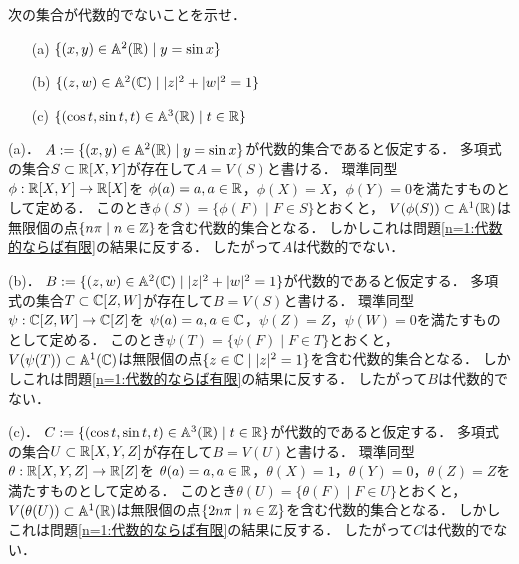 \begin{prob}
  次の集合が代数的でないことを示せ．
  \begin{itemize}
    \item[(a)] $\{(x,y) \in \mathbb{A}^2(\mathbb{R}) \mid y = \sin x\}$
    \item[(b)] $\{( z,w ) \in \mathbb{A}^2(\mathbb{C}) \mid |z|^2 + |w|^2 = 1 \}$
    \item[(c)] $\{ (\cos t, \sin t, t) \in \mathbb{A}^3(\mathbb{R}) \mid t \in \mathbb{R}\}$
  \end{itemize}
\end{prob}
\begin{ans}
  (a)．
  $A := \{(x,y) \in \mathbb{A}^2(\mathbb{R}) \mid y = \sin x\}$が代数的集合であると仮定する．
  多項式の集合$S \subset \mathbb{R}[X,Y]$が存在して$A = V(S)$と書ける．
  環準同型$\phi : \mathbb{R}[X,Y] \to \mathbb{R}[X]$を
  $\phi(a) = a, a \in \mathbb{R}$，$\phi(X) = X$，$\phi(Y) = 0$を満たすものとして定める．
  このとき$\phi(S) = \{\phi(F) \mid F \in S\}$とおくと，
  $V(\phi(S)) \subset \mathbb{A}^1(\mathbb{R})$は無限個の点$\{ n\pi \mid n \in \mathbb{Z} \}$を含む代数的集合となる．
  しかしこれは問題\ref{n=1:代数的ならば有限}の結果に反する．
  したがって$A$は代数的でない．
  
  (b)．
  $B := \{ (z,w) \in \mathbb{A}^2(\mathbb{C}) \mid |z|^2 + |w|^2 = 1 \}$が代数的であると仮定する．
  多項式の集合$T \subset \mathbb{C}[Z,W]$が存在して$B = V(S)$と書ける．
  環準同型$\psi : \mathbb{C}[Z,W] \to \mathbb{C}[Z]$を
  $\psi(a) = a, a \in \mathbb{C}$，$\psi(Z) = Z$，$\psi(W) = 0$を満たすものとして定める．
  このとき$\psi(T) = \{\psi(F) \mid F \in T\}$とおくと，
  $V(\psi(T)) \subset \mathbb{A}^1(\mathbb{C})$は無限個の点$\{ z \in \mathbb{C} \mid |z|^2 = 1 \}$を含む代数的集合となる．
  しかしこれは問題\ref{n=1:代数的ならば有限}の結果に反する．
  したがって$B$は代数的でない．

  (c)．
  $C := \{ (\cos t, \sin t, t) \in \mathbb{A}^3(\mathbb{R}) \mid t \in \mathbb{R}\}$が代数的であると仮定する．
  多項式の集合$U \subset \mathbb{R}[X,Y,Z]$が存在して$B = V(U)$と書ける．
  環準同型$\theta : \mathbb{R}[X,Y,Z] \to \mathbb{R}[Z]$を
  $\theta(a) = a, a \in \mathbb{R}$，$\theta(X) = 1$，$\theta(Y) = 0$，$\theta(Z) = Z$を満たすものとして定める．
  このとき$\theta(U) = \{\theta(F) \mid F \in U\}$とおくと，
  $V(\theta(U)) \subset \mathbb{A}^1(\mathbb{R})$は無限個の点$\{ 2n\pi \mid n \in \mathbb{Z} \}$を含む代数的集合となる．
  しかしこれは問題\ref{n=1:代数的ならば有限}の結果に反する．
  したがって$C$は代数的でない．
\end{ans}


